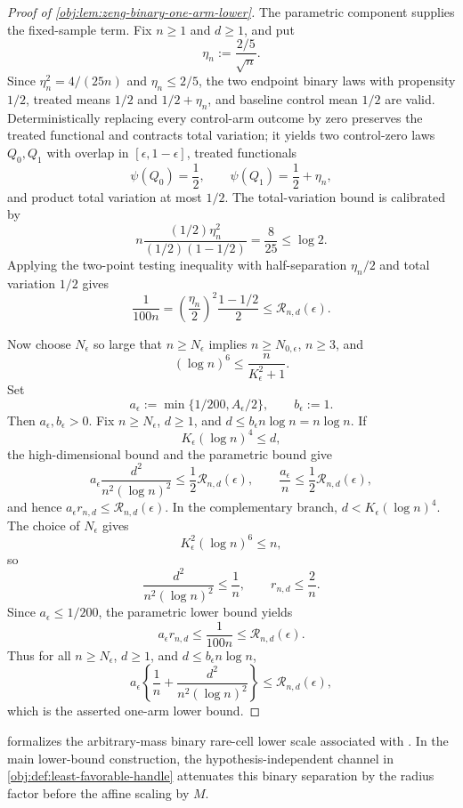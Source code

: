 \documentclass[11pt]{article}
\begin{document}
\begin{proof}[Proof of \cref{obj:lem:zeng-binary-one-arm-lower}]
The parametric component supplies the fixed-sample term.  Fix \(n\ge1\) and \(d\ge1\), and put
\[
\eta_n:=\frac{2/5}{\sqrt n}.
\]
Since \(\eta_n^2=4/(25n)\) and \(\eta_n\le2/5\), the two endpoint binary laws with propensity \(1/2\), treated means \(1/2\) and \(1/2+\eta_n\), and baseline control mean \(1/2\) are valid.  Deterministically replacing every control-arm outcome by zero preserves the treated functional and contracts total variation; it yields two control-zero laws \(Q_0,Q_1\) with overlap in \([\epsilon,1-\epsilon]\), treated functionals
\[
\psi(Q_0)=\frac12,
\qquad
\psi(Q_1)=\frac12+\eta_n,
\]
and product total variation at most \(1/2\).  The total-variation bound is calibrated by
\[
n\frac{(1/2)\eta_n^2}{(1/2)(1-1/2)}
=\frac{8}{25}
\le \log 2 .
\]
Applying the two-point testing inequality with half-separation \(\eta_n/2\) and total variation \(1/2\) gives
\[
\frac{1}{100n}
=
\left(\frac{\eta_n}{2}\right)^2\frac{1-1/2}{2}
\le \mathcal R_{n,d}(\epsilon).
\]

Now choose \(N_\epsilon\) so large that \(n\ge N_\epsilon\) implies \(n\ge N_{0,\epsilon}\), \(n\ge3\), and
\[
(\log n)^6\le \frac{n}{K_\epsilon^2+1}.
\]
Set
\[
a_\epsilon:=\min\{1/200,A_\epsilon/2\},
\qquad
b_\epsilon:=1 .
\]
Then \(a_\epsilon,b_\epsilon>0\).  Fix \(n\ge N_\epsilon\), \(d\ge1\), and \(d\le b_\epsilon n\log n=n\log n\).  If
\[
K_\epsilon(\log n)^4\le d,
\]
the high-dimensional bound and the parametric bound give
\[
a_\epsilon\frac{d^2}{n^2(\log n)^2}
\le \frac12\mathcal R_{n,d}(\epsilon),
\qquad
\frac{a_\epsilon}{n}
\le \frac12\mathcal R_{n,d}(\epsilon),
\]
and hence \(a_\epsilon r_{n,d}\le\mathcal R_{n,d}(\epsilon)\).  In the complementary branch, \(d<K_\epsilon(\log n)^4\).  The choice of \(N_\epsilon\) gives
\[
K_\epsilon^2(\log n)^6\le n,
\]
so
\[
\frac{d^2}{n^2(\log n)^2}
\le \frac1n,
\qquad
r_{n,d}\le \frac2n .
\]
Since \(a_\epsilon\le1/200\), the parametric lower bound yields
\[
a_\epsilon r_{n,d}
\le \frac{1}{100n}
\le \mathcal R_{n,d}(\epsilon).
\]
Thus for all \(n\ge N_\epsilon\), \(d\ge1\), and \(d\le b_\epsilon n\log n\),
\[
a_\epsilon\left\{\frac1n+\frac{d^2}{n^2(\log n)^2}\right\}
\le \mathcal R_{n,d}(\epsilon),
\]
which is the asserted one-arm lower bound.
\end{proof}

 formalizes the arbitrary-mass binary rare-cell lower scale associated with \citet{ZengBalakrishnanHanKennedy2024}. In the main lower-bound construction, the hypothesis-independent channel in \cref{obj:def:least-favorable-handle} attenuates this binary separation by the radius factor before the affine scaling by \(M\).
\end{document}
